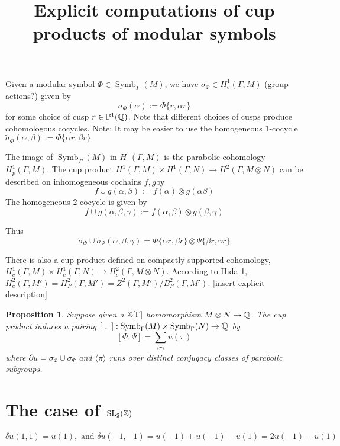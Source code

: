 \documentclass[12pt]{article}
\newtheorem{prop}[thm]{Proposition}
\theoremstyle{definition}
\def\Z{{\Bbb Z}}
\def\Q{{\Bbb Q}}
\def\P{\mathbb{P}}
\def\SL{\operatorname{SL}}
\def\Symb{\operatorname{Symb}}
\def\P{\mathbb{P}}
\begin{document}
\title{Explicit computations of cup products of modular symbols}
\maketitle

Given a modular symbol $\Phi\in\Symb_\Gamma(M)$, we have $\sigma_\Phi \in H^1_c(\Gamma,M)$ (group actions?) given by
$$\sigma_\Phi(\alpha) :=\Phi\{r,\alpha r\}$$
for some choice of cusp $r\in \P^1(\Q)$. Note that different choices of cusps produce cohomologous cocycles.
Note: It may be easier to use the homogeneous $1$-cocycle $\widetilde{\sigma}_{\Phi}(\alpha,\beta):=\Phi\{\alpha r,\beta r\}$

The image of $\Symb_\Gamma(M)$ in $H^1(\Gamma,M)$ is the parabolic cohomology $H^1_p(\Gamma,M)$. The cup product  $H^1(\Gamma,M)\times H^1(\Gamma,N)\rightarrow H^2(\Gamma,M\otimes N)$ can be described on inhomogeneous cochains $f,g$by
$$ f\cup g (\alpha,\beta):=f(\alpha)\otimes g(\alpha\beta)$$
The homogeneous $2$-cocycle is given by
$$ f\cup g (\alpha,\beta,\gamma):=f(\alpha,\beta) \otimes g(\beta,\gamma)$$

Thus
$$\widetilde{\sigma}_\Phi \cup \widetilde{\sigma}_\Psi(\alpha,\beta,\gamma)= \Phi\{\alpha r,\beta r\}\otimes\Psi\{\beta r,\gamma r\}$$

There is also a cup product defined on compactly supported cohomology, $H^1_c(\Gamma,M)\times H^1_c(\Gamma,N)\rightarrow H^2_c(\Gamma,M\otimes N)$. According to Hida \ref{}, $H^2_c(\Gamma, M')=H^2_P(\Gamma,M')=Z^2(\Gamma,M')/B_P^2(\Gamma,M')$. [insert explicit description]

\begin{prop}
Suppose given a $\Z[\Gamma]$ homomorphism $M\otimes N\rightarrow \Q$. The cup product induces a pairing $[~,~] : \Symb_\Gamma(M)\times \Symb_\Gamma(N) \rightarrow \Q$ by
$$[\Phi,\Psi]=\sum_{\langle \pi\rangle } u(\pi)$$
where $\partial u= \sigma_\Phi \cup \sigma_\Psi$ and $\langle \pi\rangle $ runs over distinct conjugacy classes of parabolic subgroups.
\end{prop}

\section{The case of $\SL_2(\Z)$}
\begin{equation*}
	\delta u(1,1)=u(1), \text{ and } \delta u(-1,-1) =u(-1)+u(-1)-u(1)=2u(-1)-u(1)
\end{equation*}
\end{document}
